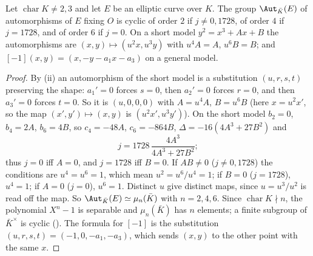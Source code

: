 \begin{proposition}[automorphisms]\label{prop:ellcurves:aut}
Let $\operatorname{char}K\ne2,3$ and let $E$ be an elliptic curve over $K$. The group $\Aut_{\bar K}(E)$ of automorphisms of $E$ fixing $O$ is
cyclic of order $2$ if $j\ne0,1728$, of order $4$ if $j=1728$, and of order $6$ if $j=0$. On a short model $y^2=x^3+Ax+B$ the automorphisms are
$(x,y)\mapsto(u^2x,u^3y)$ with $u^4A=A$, $u^6B=B$; and $[-1](x,y)=(x,-y-a_1x-a_3)$ on a general model.
\end{proposition}

\begin{proof}
By (ii) an automorphism of the short model is a substitution $(u,r,s,t)$ preserving the shape: $a_1'=0$
forces $s=0$, then $a_2'=0$ forces $r=0$, and then $a_3'=0$ forces $t=0$. So it is $(u,0,0,0)$ with $A=u^4A$, $B=u^6B$ (here $x=u^2x'$, so the map
$(x',y')\mapsto(x,y)$ is $(u^2x',u^3y')$). On the short model $b_2=0$, $b_4=2A$, $b_6=4B$, so $c_4=-48A$, $c_6=-864B$, $\Delta=-16(4A^3+27B^2)$ and
\[
j=1728\,\frac{4A^3}{4A^3+27B^2};
\]
thus $j=0$ iff $A=0$, and $j=1728$ iff $B=0$. If $AB\ne0$ ($j\ne0,1728$) the conditions are $u^4=u^6=1$, which mean $u^2=u^6/u^4=1$; if $B=0$ ($j=1728$),
$u^4=1$; if $A=0$ ($j=0$), $u^6=1$. Distinct $u$ give distinct maps, since $u=u^3/u^2$ is read off the map. So $\Aut_{\bar K}(E)\simeq\mu_n(\bar K)$ with $n=2,4,6$. Since
$\operatorname{char}K\nmid n$, the polynomial $X^n-1$ is separable and $\mu_n(\bar K)$ has $n$ elements; a finite subgroup of $\bar K^\times$ is cyclic (). The formula for $[-1]$ is the substitution $(u,r,s,t)=(-1,0,-a_1,-a_3)$, which sends $(x,y)$ to the other point
with the same $x$.
\end{proof}

